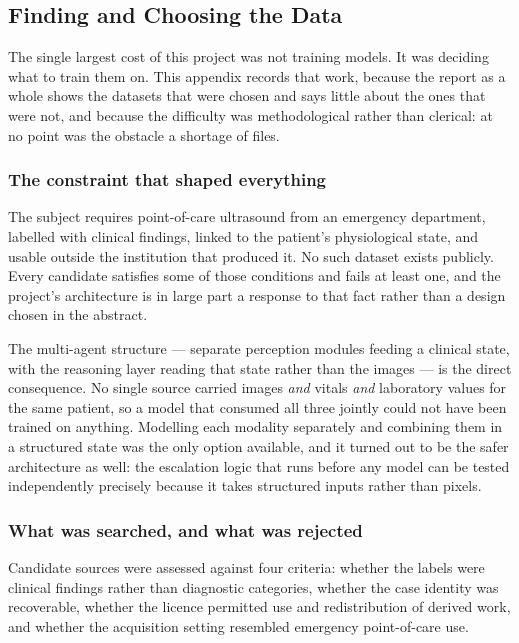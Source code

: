 \subsection{Finding and Choosing the Data}
\label{app:data-search}

The single largest cost of this project was not training models. It was deciding what to train
them on. This appendix records that work, because the report as a whole shows the datasets that
were chosen and says little about the ones that were not, and because the difficulty was
methodological rather than clerical: at no point was the obstacle a shortage of files.

\subsubsection{The constraint that shaped everything}

The subject requires point-of-care ultrasound from an emergency department, labelled with
clinical findings, linked to the patient's physiological state, and usable outside the
institution that produced it. No such dataset exists publicly. Every candidate satisfies some
of those conditions and fails at least one, and the project's architecture is in large part a
response to that fact rather than a design chosen in the abstract.

The multi-agent structure --- separate perception modules feeding a clinical state, with the
reasoning layer reading that state rather than the images --- is the direct consequence. No
single source carried images \emph{and} vitals \emph{and} laboratory values for the same
patient, so a model that consumed all three jointly could not have been trained on anything.
Modelling each modality separately and combining them in a structured state was the only
option available, and it turned out to be the safer architecture as well: the escalation logic
that runs before any model can be tested independently precisely because it takes structured
inputs rather than pixels.

\subsubsection{What was searched, and what was rejected}

Candidate sources were assessed against four criteria: whether the labels were clinical
findings rather than diagnostic categories, whether the case identity was recoverable, whether
the licence permitted use and redistribution of derived work, and whether the acquisition
setting resembled emergency point-of-care use.

